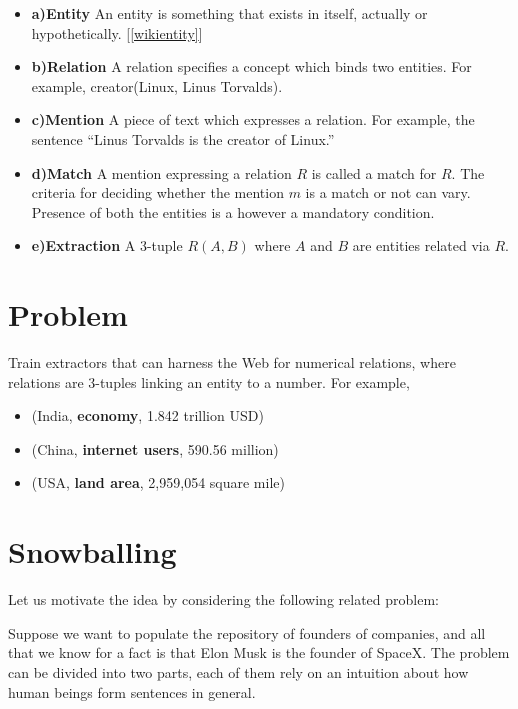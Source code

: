 \documentclass[a4paper,10pt]{article}
\begin{document}
\begin{itemize}

\item \textbf{a)Entity}
An entity is something that exists in itself, actually or hypothetically. [\ref{wikientity}]

\item \textbf{b)Relation}
A relation specifies a concept which binds two entities. For example, creator(Linux, Linus Torvalds).

\item \textbf{c)Mention}
 A piece of text which expresses a relation. For example, the sentence ``Linus Torvalds is the creator of Linux.''

\item \textbf{d)Match}
A mention expressing a relation $R$ is called a match for $R$. The criteria for deciding whether the mention $m$ is a match or not 
can vary. Presence of both the entities is a however a mandatory condition.

\item \textbf{e)Extraction}
A 3-tuple $R(A, B)$ where $A$ and $B$ are entities related via $R$.
\end{itemize}

\section{Problem}
Train extractors that can harness the Web for numerical relations, where relations are 3-tuples linking an entity
to a number. For example,
    \begin{itemize}
	\item  (India, \textbf{economy}, 1.842 trillion USD)
	\item  (China, \textbf{internet users},  590.56 million)
	\item  (USA, \textbf{land area}, 2,959,054 square mile)
    \end{itemize}

\section{Snowballing}
Let us motivate the idea by considering the following related problem:

Suppose we want to populate the repository of founders of companies, and all that we know
for a fact is that Elon Musk is the founder of SpaceX.
The problem can be divided into two parts, each of them rely on an intuition about how human 
beings form sentences in general.
\end{document}
